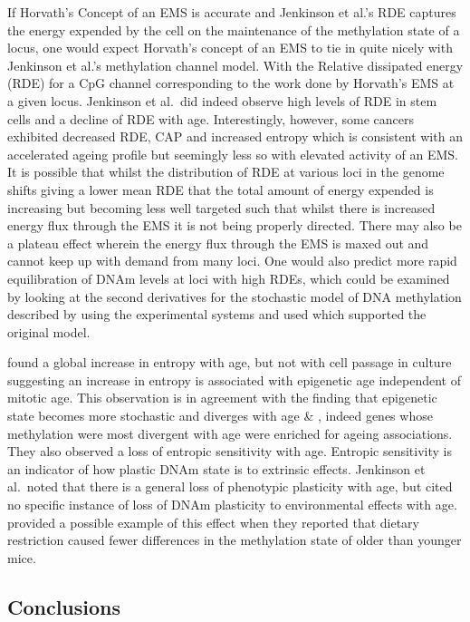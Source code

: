 \documentclass[]{book}
\begin{document}
If Horvath's Concept of an EMS is accurate and Jenkinson et al.'s RDE captures the energy expended by the cell on the maintenance of the methylation state of a locus, one would expect Horvath's concept of an EMS to tie in quite nicely with Jenkinson et al.'s methylation channel model. With the Relative dissipated energy (RDE) for a CpG channel corresponding to the work done by Horvath's EMS at a given locus. Jenkinson et al.~did indeed observe high levels of RDE in stem cells and a decline of RDE with age. Interestingly, however, some cancers exhibited decreased RDE, CAP and increased entropy which is consistent with an accelerated ageing profile but seemingly less so with elevated activity of an EMS. It is possible that whilst the distribution of RDE at various loci in the genome shifts giving a lower mean RDE that the total amount of energy expended is increasing but becoming less well targeted such that whilst there is increased energy flux through the EMS it is not being properly directed. There may also be a plateau effect wherein the energy flux through the EMS is maxed out and cannot keep up with demand from many loci. One would also predict more rapid equilibration of DNAm levels at loci with high RDEs, which could be examined by looking at the second derivatives for the stochastic model of DNA methylation described by \citet{Pfeifer1990a} using the experimental systems \citet{Laird2004} and \citet{Riggs2004a} used which supported the original model.

\citet{Jenkinson2017} found a global increase in entropy with age, but not with cell passage in culture suggesting an increase in entropy is associated with epigenetic age independent of mitotic age. This observation is in agreement with the finding that epigenetic state becomes more stochastic and diverges with age \citep{Fraga2005} \& \citep{Slieker2016}, indeed genes whose methylation were most divergent with age were enriched for ageing associations. They also observed a loss of entropic sensitivity with age. Entropic sensitivity is an indicator of how plastic DNAm state is to extrinsic effects. Jenkinson et al.~noted that there is a general loss of phenotypic plasticity with age, but cited no specific instance of loss of DNAm plasticity to environmental effects with age. \citet{Hahn2017} provided a possible example of this effect when they reported that dietary restriction caused fewer differences in the methylation state of older than younger mice.

\hypertarget{conclusions}{%
\subsection{Conclusions}\label{conclusions}}
\end{document}
